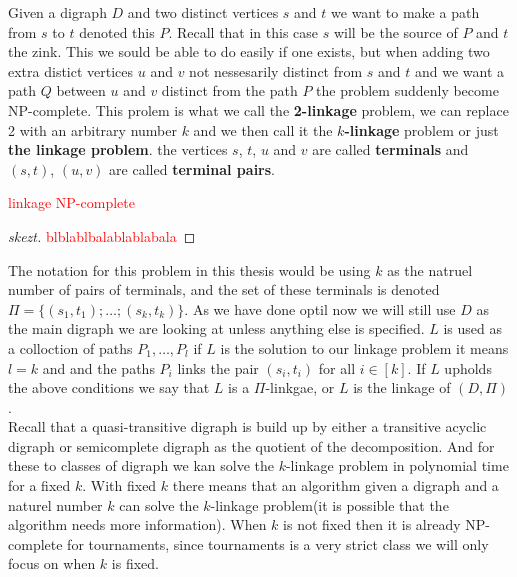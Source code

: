 Given a digraph $D$ and two distinct vertices $s$ and $t$ we want to make a path from $s$ to $t$ denoted this $P$. 
Recall that in this case $s$ will be the source of $P$ and $t$ the zink.
This we sould be able to do easily if one exists, but when adding two extra distict vertices $u$ and $v$ not nessesarily distinct from $s$ and $t$ and we want a path $Q$ between $u$ and $v$ distinct from the path $P$ the problem suddenly become NP-complete.
This prolem is what we call the \textbf{2-linkage} problem, we can replace 2 with an arbitrary number $k$ and we then call it the \textbf{$k$-linkage} problem or just \textbf{the linkage problem}. 
the vertices $s$, $t$, $u$ and $v$ are called \textbf{terminals} and $(s,t)$, $(u,v)$ are called \textbf{terminal pairs}.
\begin{thm}
    \textcolor{red}{linkage NP-complete}
\end{thm}
\begin{proof}[skezt]
    \textcolor{red}{blblablbalablablabala}
\end{proof}
The notation for this problem in this thesis would be using $k$ as the natruel number of pairs of terminals, and the set of these terminals is denoted $\Pi=\lbrace (s_1,t_1);\dots ;(s_k,t_k)\rbrace$. 
As we have done optil now we will still use $D$ as the main digraph we are looking at unless anything else is specified. 
$L$ is used as a colloction of paths $P_1,\dots , P_l$ if $L$ is the solution to our linkage problem it means $l=k$ and and the paths $P_i$ links the pair $(s_i,t_i)$ for all $i\in [k]$.
If $L$ upholds the above conditions we say that $L$ is a $\Pi$-linkgae, or $L$ is the linkage of $(D,\Pi)$.\\
Recall that a quasi-transitive digraph is build up by either a transitive acyclic digraph or semicomplete digraph as the quotient of the decomposition. 
And for these to classes of digraph we kan solve the $k$-linkage problem in polynomial time for a fixed $k$. With fixed $k$ there means that an algorithm given a digraph and a naturel number $k$ can solve the $k$-linkage problem(it is possible that the algorithm needs more information). When $k$ is not fixed then it is already NP-complete for tournaments, since tournaments is a very strict class we will only focus on when $k$ is fixed.
